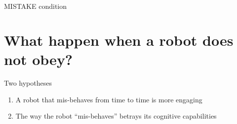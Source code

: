 \documentclass[compress]{beamer}
\renewcommand{\bf}{\Medium}
\begin{document}
\begin{frame}{MISTAKE condition}

    \centering
\end{frame}

\section{What happen when a robot does not obey?}


\begin{frame}{Two hypotheses}
\begin{enumerate}
    \item<1-> {\bf A robot that mis-behaves from time to time is more
        engaging}
    \item<2-> {\bf The way the robot ``mis-behaves'' betrays its cognitive
    capabilities}
\end{enumerate}


\end{frame}

\end{document}
